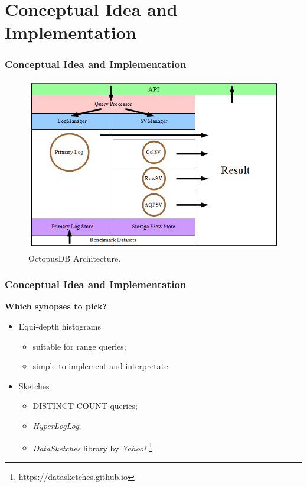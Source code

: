 \documentclass{beamer}
\begin{document}
\section{Conceptual Idea and Implementation}
\begin{frame}
\frametitle{Conceptual Idea and Implementation}
\begin{figure}
\centering
\includegraphics[scale=0.5]{img/blinktopus_architecture.png}
\caption{OctopusDB Architecture.}
\end{figure}
\end{frame}

\begin{frame}
\frametitle{Conceptual Idea and Implementation}
\textbf{Which synopses to pick?} \pause
\begin{itemize}
\item{Equi-depth histograms}
\begin{itemize}
\item{suitable for range queries;}
\item{simple to implement and interpretate.}
\end{itemize}
\pause
\item{Sketches}
\begin{itemize}
\item{DISTINCT COUNT queries;}
\item{\emph{HyperLogLog};}
\item{\textit{DataSketches} library by \textit{Yahoo!} \footnote{https://datasketches.github.io}}
\end{itemize}
\end{itemize}
\end{frame}
\end{document}
